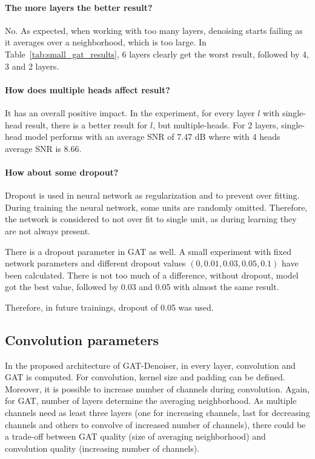 \paragraph{The more layers the better result?}
No. As expected, when working with too many layers, denoising starts failing as it averages over a
neighborhood, which is too large. In Table~\ref{tab:small_gat_results}, 6 layers clearly get the worst result,
followed by 4, 3 and 2 layers.

\paragraph{How does multiple heads affect result?}
It has an overall positive impact. 
In the experiment, for every layer $l$ with single-head result, there
is a better result for $l$, but multiple-heads. 
For 2 layers, single-head model performs with an average SNR of 7.47 dB where with 4 heads average SNR is 8.66.

\paragraph{How about some dropout?}

Dropout is used in neural network as regularization and to prevent over fitting. 
During training the neural network, some units are randomly omitted. Therefore, the network is 
considered to not over fit to single unit, as during learning they are not always present.

There is a dropout parameter in GAT as well. A small experiment with fixed network parameters
and different dropout values $(0, 0.01, 0.03, 0.05, 0.1)$ have been calculated. 
There is not too much of a difference, without dropout, model got the best value, followed by 
0.03 and 0.05 with almost the same result. 

Therefore, in future trainings, dropout of 0.05 was used.


\subsection{Convolution parameters}

In the proposed architecture of GAT-Denoiser, in every layer, convolution and GAT is computed. For convolution, kernel size and padding can be defined.
Moreover, it is possible to increase number of channels during convolution. 
Again, for GAT, number of layers determine the averaging neighborhood.
As multiple channels need as least three layers (one for increasing channels, last for decreasing channels and others to convolve of increased number of channels),
there could be a trade-off between GAT quality (size of averaging neighborhood) and convolution quality (increasing number of channels). 

